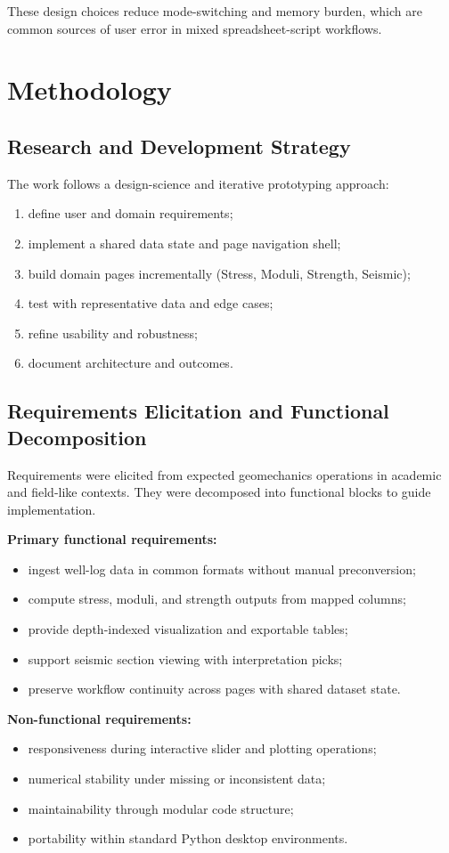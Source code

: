 \documentclass[12pt,a4paper]{report}
\begin{document}
These design choices reduce mode-switching and memory burden, which are common sources of user error in mixed spreadsheet-script workflows.

\chapter{Methodology}
\section{Research and Development Strategy}
The work follows a design-science and iterative prototyping approach:
\begin{enumerate}
    \item define user and domain requirements;
    \item implement a shared data state and page navigation shell;
    \item build domain pages incrementally (Stress, Moduli, Strength, Seismic);
    \item test with representative data and edge cases;
    \item refine usability and robustness;
    \item document architecture and outcomes.
\end{enumerate}

\section{Requirements Elicitation and Functional Decomposition}
Requirements were elicited from expected geomechanics operations in academic and field-like contexts. They were decomposed into functional blocks to guide implementation.

\textbf{Primary functional requirements:}
\begin{itemize}
    \item ingest well-log data in common formats without manual preconversion;
    \item compute stress, moduli, and strength outputs from mapped columns;
    \item provide depth-indexed visualization and exportable tables;
    \item support seismic section viewing with interpretation picks;
    \item preserve workflow continuity across pages with shared dataset state.
\end{itemize}

\textbf{Non-functional requirements:}
\begin{itemize}
    \item responsiveness during interactive slider and plotting operations;
    \item numerical stability under missing or inconsistent data;
    \item maintainability through modular code structure;
    \item portability within standard Python desktop environments.
\end{itemize}
\end{document}
